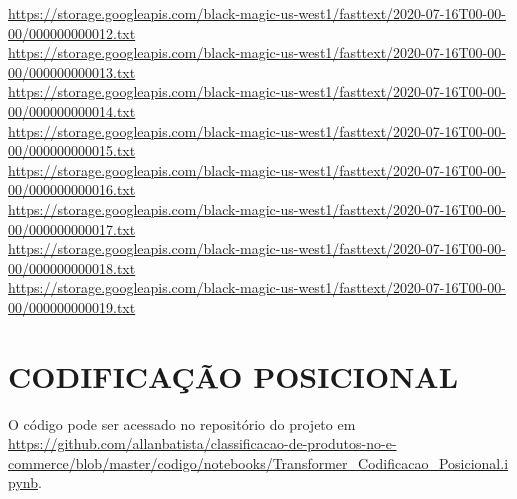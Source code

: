 \begin{apendicesenv}
\begin{simpletext}
\url{https://storage.googleapis.com/black-magic-us-west1/fasttext/2020-07-16T00-00-00/000000000012.txt} \\
\url{https://storage.googleapis.com/black-magic-us-west1/fasttext/2020-07-16T00-00-00/000000000013.txt} \\
\url{https://storage.googleapis.com/black-magic-us-west1/fasttext/2020-07-16T00-00-00/000000000014.txt} \\
\url{https://storage.googleapis.com/black-magic-us-west1/fasttext/2020-07-16T00-00-00/000000000015.txt} \\
\url{https://storage.googleapis.com/black-magic-us-west1/fasttext/2020-07-16T00-00-00/000000000016.txt} \\
\url{https://storage.googleapis.com/black-magic-us-west1/fasttext/2020-07-16T00-00-00/000000000017.txt} \\
\url{https://storage.googleapis.com/black-magic-us-west1/fasttext/2020-07-16T00-00-00/000000000018.txt} \\
\url{https://storage.googleapis.com/black-magic-us-west1/fasttext/2020-07-16T00-00-00/000000000019.txt}
\end{simpletext}

\chapter{CODIFICAÇÃO POSICIONAL}
\label{chap:transformer_codificao_posicional}

O código pode ser acessado no repositório do projeto em \url{https://github.com/allanbatista/classificacao-de-produtos-no-e-commerce/blob/master/codigo/notebooks/Transformer_Codificacao_Posicional.ipynb}.

\end{apendicesenv}